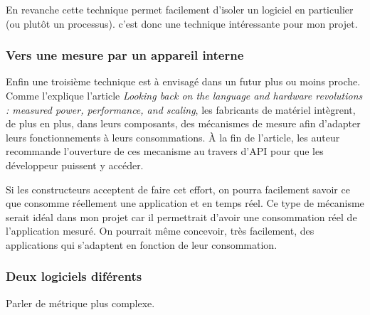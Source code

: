 \documentclass[a4paper, 11pt]{report}
\begin{document}
En revanche cette technique permet facilement d'isoler un logiciel en particulier (ou plutôt un processus). c'est donc une technique intéressante pour mon projet.

			\subsubsection{Vers une mesure par un appareil interne}
Enfin une troisième technique est à envisagé dans un futur plus ou moins proche. Comme l'explique l'article \textit{Looking back on the language and hardware revolutions
: measured power, performance, and scaling}\cite{Esmaeilzadeh:2011:LBL:1950365.1950402}, les fabricants de matériel intègrent, de plus en plus, dans leurs composants, des mécanismes de mesure afin d'adapter leurs fonctionnements à leurs consommations. À la fin de l'article, les auteur recommande l'ouverture de ces mecanisme au travers d'API pour que les développeur puissent y accéder.

Si les constructeurs acceptent de faire cet effort, on pourra facilement savoir ce que consomme réellement une application et en temps réel. Ce type de mécanisme serait idéal dans mon projet car il permettrait d'avoir une consommation réel de l'application mesuré. On pourrait même concevoir, très facilement, des applications qui s'adaptent en fonction de leur consommation.



			\subsubsection{Deux logiciels diférents}
Parler de métrique plus complexe.
		
\end{document}
